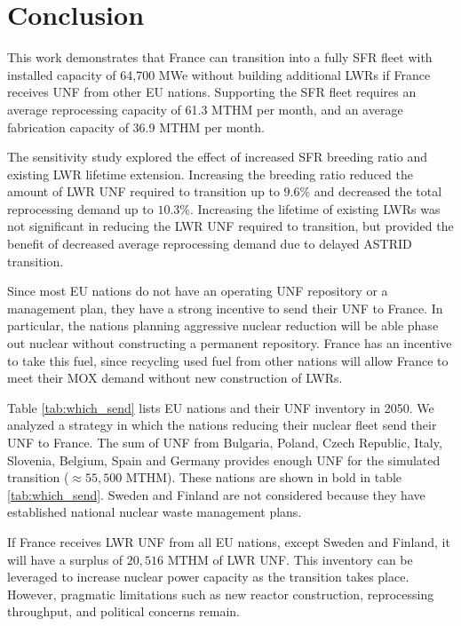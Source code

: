 \section{Conclusion}

This work demonstrates that France can transition into
a fully \gls{SFR} fleet with installed capacity of 64,700 \gls{MWe} without
building additional \glspl{LWR}
if France receives \gls{UNF} from other \gls{EU} nations.
Supporting the \gls{SFR} fleet requires an average 
reprocessing capacity of 61.3 \gls{MTHM} per month,
and an average fabrication capacity of 36.9 \gls{MTHM} per month.

The sensitivity study explored the effect of increased \gls{SFR} breeding
ratio and existing \gls{LWR} lifetime extension. Increasing the breeding
ratio reduced the amount of \gls{LWR} \gls{UNF} required to transition
up to $9.6\%$ and decreased the total reprocessing demand up to $10.3\%$.
Increasing the lifetime of existing \glspl{LWR} was not significant
in reducing the \gls{LWR} \gls{UNF} required to transition, but provided the benefit of
decreased average reprocessing demand due to delayed \gls{ASTRID} transition.

Since most \gls{EU} nations do not have an operating \gls{UNF}
repository or a management plan, they have a strong incentive
to send their \gls{UNF} to France. In particular, the nations
planning aggressive nuclear reduction will be able phase out nuclear
without constructing a permanent repository. France has an
incentive to take this fuel, since recycling used fuel from
other nations will allow France to meet their MOX demand
without new construction of \glspl{LWR}.

Table \ref{tab:which_send} lists \gls{EU} nations and their \gls{UNF} inventory
in 2050. We analyzed a strategy in which 
the nations reducing their nuclear fleet send their \gls{UNF} to France.
The sum of \gls{UNF} from Bulgaria, Poland, Czech Republic, Italy, Slovenia,
Belgium, Spain and Germany
provides enough \gls{UNF} for the simulated transition ($\approx 55,500$ MTHM). 
These nations are shown in bold in table \ref{tab:which_send}.
Sweden and Finland are not considered because they have established
national nuclear waste management plans.

If France receives \gls{LWR} \gls{UNF} from all \gls{EU} nations,
except Sweden and Finland,
it will have a surplus of $20,516$ MTHM of \gls{LWR} \gls{UNF}. This
inventory can be leveraged to increase nuclear power capacity as
the transition takes place. However, pragmatic limitations such
as new reactor construction, reprocessing throughput, and
political concerns remain.


